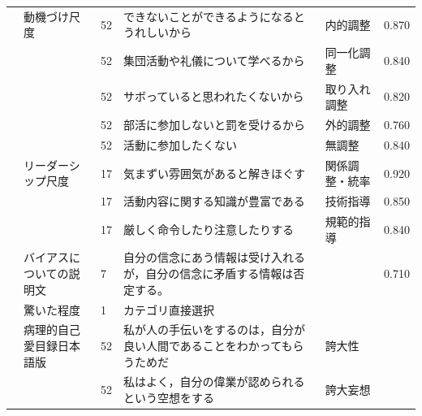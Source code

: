 \begin{landscape}
\begin{longtable}{p{2cm}p{2cm}p{2cm}p{6cm}p{2cm}p{2cm}}
                                 & 動機づけ尺度                           & 52  & できないことができるようになるとうれしいから                              & 内的調整                 & 0.870   \\
                                 &                                  & 52  & 集団活動や礼儀について学べるから                                    & 同一化調整                & 0.840   \\
                                 &                                  & 52  & サボっていると思われたくないから                                    & 取り入れ調整               & 0.820   \\
                                 &                                  & 52  & 部活に参加しないと罰を受けるから                                    & 外的調整                 & 0.760   \\
                                 &                                  & 52  & 活動に参加したくない                                          & 無調整                  & 0.840   \\
                                 & リーダーシップ尺度                        & 17  & 気まずい雰囲気があると解きほぐす                                    & 関係調整・統率              & 0.920   \\
                                 &                                  & 17  & 活動内容に関する知識が豊富である                                    & 技術指導                 & 0.850   \\
                                 &                                  & 17  & 厳しく命令したり注意したりする                                     & 規範的指導                & 0.840   \\
        \citet{Kambara202192}    & バイアスについての説明文                     & 7   & 自分の信念にあう情報は受け入れるが，自分の信念に矛盾する情報は否定する。                &                      & 0.710   \\
                                 & 驚いた程度                            & 1   & カテゴリ直接選択                                            &                      &         \\
        \citet{Kawasaki202192}   & 病理的自己愛目録日本語版                     & 52  & 私が人の手伝いをするのは，自分が良い人間であることをわかってもらうためだ                & 誇大性                  &         \\
                                 &                                  & 52  & 私はよく，自分の偉業が認められるという空想をする                            & 誇大妄想                 &         \\

\end{longtable}
\end{landscape}
